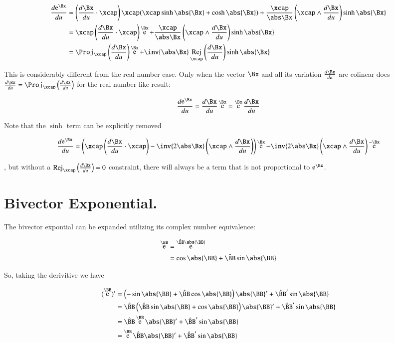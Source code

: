 \documentclass{article}      %
\DeclareMathOperator{\Exp}{e}
\DeclareMathOperator{\Rej}{Rej}
\newcommand{\Bcap}[0]{\hat{\BB}}
\newcommand{\Babs}[0]{\abs{\BB}}
\newcommand{\ddu}[1] {\frac {d{#1}} {du}}
\begin{document}
\begin{align*}
\ddu{\Exp^{\Bx}} 
&= 
\left(\ddu{\Bx} \cdot \xcap\right) \xcap
( \xcap \sinh\abs{\Bx} + \cosh\abs{\Bx} ) 
 + \frac{\xcap}{\abs\Bx} \left(\xcap \wedge \ddu{\Bx} \right) \sinh\abs{\Bx} \\
&= 
\xcap \left(\ddu{\Bx} \cdot \xcap\right)\Exp^{\Bx}
 + \frac{\xcap}{\abs\Bx} \left(\xcap \wedge \ddu{\Bx} \right) \sinh\abs{\Bx} \\
&= 
\Proj_{\xcap}\left(\ddu{\Bx}\right) \Exp^{\Bx}
 + \inv{\abs\Bx} \Rej_{\xcap}\left(\ddu{\Bx}\right) \sinh\abs{\Bx} \\
\end{align*}

This is considerably different from the real number case.  Only when the vector $\Bx$ and all its variation
$\ddu{\Bx}$ are colinear does $\ddu{\Bx} = \Proj_{\xcap}\left(\ddu{\Bx}\right)$ for the real number like result:

\begin{equation}
\ddu{\Exp^{\Bx}} = \ddu{\Bx} \Exp^{\Bx} = \Exp^{\Bx} \ddu{\Bx} 
\end{equation}

Note that the $\sinh$ term can be explicitly removed

\begin{align*}
\ddu{\Exp^{\Bx}} 
=
\left(\xcap \left(\ddu{\Bx} \cdot \xcap\right) - \inv{2\abs\Bx}\left(\xcap \wedge \ddu{\Bx} \right) \right) \Exp^{\Bx}
 - \inv{2\abs\Bx}\left(\xcap \wedge \ddu{\Bx} \right) \Exp^{-\Bx} \\
\end{align*}

, but without a $\Rej_{\xcap}\left(\ddu{\Bx}\right) = 0$
constraint, there will always be a term that is not proportional to $\Exp^{\Bx}$.

\section{ Bivector Exponential. }

The bivector expontial can be expanded utilizing its complex number equivalence:

\begin{align*}
\Exp^{\BB}
&= \Exp^{\Bcap\Babs} \\
&= \cos{\Babs} + \Bcap\sin{\Babs} \\
\end{align*}

So, taking the derivitive we have

\begin{align*}
(\Exp^{\BB})'
&= \left(-\sin\Babs + \Bcap\cos\Babs\right)\Babs' + \Bcap' \sin\Babs \\
&= \Bcap \left(\Bcap\sin\Babs + \cos\Babs\right)\Babs' + \Bcap' \sin\Babs \\
&= \Bcap \Exp^{\BB} \Babs' + \Bcap' \sin\Babs \\
&= \Exp^{\BB} \Bcap \Babs' + \Bcap' \sin\Babs \\
\end{align*}
\end{document}

